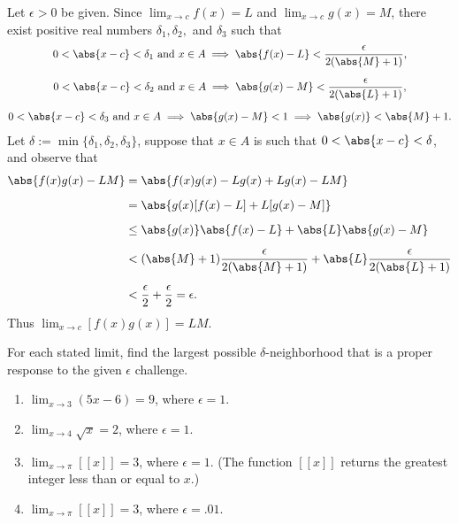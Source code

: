 \documentclass{lew98_solutions}
\begin{document}
\begin{solution}
\begin{enumerate}
        Let \( \epsilon > 0 \) be given. Since \( \lim_{x \to c} f(x) = L \) and \( \lim_{x \to c} g(x) = M \), there exist positive real numbers \( \delta_1, \delta_2, \) and \( \delta_3 \) such that
        \begin{gather*}
            0 < \abs{x - c} < \delta_1 \text{ and } x \in A \implies \abs{f(x) - L} < \frac{\epsilon}{2(\abs{M} + 1)}, \\[2mm]
            0 < \abs{x - c} < \delta_2 \text{ and } x \in A \implies \abs{g(x) - M} < \frac{\epsilon}{2(\abs{L} + 1)}, \\[2mm]
            0 < \abs{x - c} < \delta_3 \text{ and } x \in A \implies \abs{g(x) - M} < 1 \implies \abs{g(x)} < \abs{M} + 1.
        \end{gather*}
        Let \( \delta := \min \{ \delta_1, \delta_2, \delta_3 \} \), suppose that \( x \in A \) is such that \( 0 < \abs{x - c} < \delta \), and observe that
        \begin{align*}
            \abs{f(x)g(x) - LM} &= \abs{f(x)g(x) - Lg(x) + Lg(x) - LM} \\[2mm]
            &= \abs{g(x)[f(x) - L] + L[g(x) - M]} \\[2mm]
            &\leq \abs{g(x)} \abs{f(x) - L} + \abs{L} \abs{g(x) - M} \\[2mm]
            &< (\abs{M} + 1) \frac{\epsilon}{2(\abs{M} + 1)} + \abs{L} \frac{\epsilon}{2(\abs{L} + 1)} \\[2mm]
            &< \frac{\epsilon}{2} + \frac{\epsilon}{2} = \epsilon.
        \end{align*}
        Thus \( \lim_{x \to c} [f(x)g(x)] = LM \).
    \end{enumerate}
\end{solution}

\begin{exercise}
\label{ex:4.2.2}
    For each stated limit, find the largest possible \( \delta \)-neighborhood that is a proper response to the given \( \epsilon \) challenge.
    \begin{enumerate}
        \item \( \lim_{x \to 3} (5x - 6) = 9 \), where \( \epsilon = 1 \).

        \item \( \lim_{x \to 4} \sqrt{x} = 2 \), where \( \epsilon = 1 \).

        \item \( \lim_{x \to \pi} [[x]] = 3 \), where \( \epsilon = 1 \). (The function \( [[x]] \) returns the greatest integer less than or equal to \( x \).)

        \item \( \lim_{x \to \pi} [[x]] = 3 \), where \( \epsilon = .01 \).
    \end{enumerate}
\end{exercise}
\end{document}

